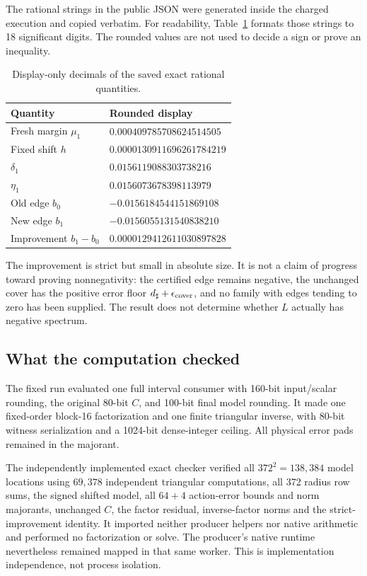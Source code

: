 \documentclass[11pt,a4paper]{article}
\theoremstyle{definition}
\theoremstyle{remark}
\numberwithin{equation}{section}
\begin{document}
The rational strings in the public JSON were generated inside the charged
execution and copied verbatim. For readability, Table~\ref{tab:values}
formats those strings to 18 significant digits. The rounded values are not
used to decide a sign or prove an inequality.
\begin{table}[ht]
\centering
\caption{Display-only decimals of the saved exact rational quantities.}
\label{tab:values}
\begin{tabular}{ll}
\toprule
Quantity & Rounded display\\
\midrule
Fresh margin \(\mu_1\) & \(0.000409785708624514505\)\\
Fixed shift \(h\) & \(0.0000130911696261784219\)\\
\(\delta_1\) & \(0.0156119088303738216\)\\
\(\eta_1\) & \(0.0156073678398113979\)\\
Old edge \(b_0\) & \(-0.0156184544151869108\)\\
New edge \(b_1\) & \(-0.0156055131540838210\)\\
Improvement \(b_1-b_0\) & \(0.0000129412611030897828\)\\
\bottomrule
\end{tabular}
\end{table}

The improvement is strict but small in absolute size. It is not a claim
of progress toward proving nonnegativity: the certified edge remains
negative, the unchanged cover has the positive error floor
\(d_\sharp+\epsilon_{\rm cover}\), and no family with edges tending to zero
has been supplied. The result does not determine whether \(L\) actually
has negative spectrum.

\subsection{What the computation checked}\label{sec:checks}

The fixed run evaluated one full interval consumer with 160-bit input/scalar
rounding, the original 80-bit \(C\), and 100-bit final model rounding.
It made one fixed-order block-16 factorization and one finite triangular
inverse, with 80-bit witness serialization and a 1024-bit dense-integer
ceiling. All physical error pads remained in the majorant.

The independently implemented exact checker verified all \(372^2=138{,}384\)
model locations using \(69{,}378\) independent triangular computations,
all 372 radius row sums, the signed shifted model, all \(64+4\) action-error
bounds and norm majorants, unchanged \(C\), the factor residual, inverse-factor
norms and the strict-improvement identity. It imported neither producer
helpers nor native arithmetic and performed no factorization or solve.
The producer's native runtime nevertheless remained mapped in that same
worker. This is implementation independence, not process isolation.
\end{document}
